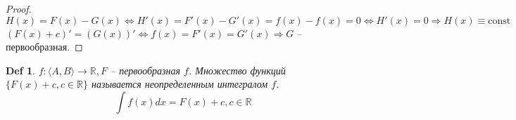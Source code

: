 \documentclass[12pt]{article}
\def\R{\mathbb{R}}       %
\def\SO{\Rightarrow}     %
\def\EQ{\Leftrightarrow} %
\theoremstyle{definition} %
\theoremstyle{plain} %
\newtheorem{Def}[Thm]{Def} %
\theoremstyle{remark} %
\begin{document}
\begin{proof}
    $H(x) = F(x) - G(x) \EQ H'(x) = F'(x) - G'(x) = f(x) - f(x) = 0 \EQ H'(x) = 0 \SO H(x) \equiv \text{const}$ \\
    $(F(x) + c)' = (G(x))' \EQ f(x) = F'(x) = G'(x) \SO G$ -- первообразная.  
\end{proof}

\begin{Def}
    $f : \langle A, B\rangle \to \R, F$ -- первообразная $f$. Множество функций 
    $\{F(x) + c, c \in \R\}$ называется неопределенным интегралом $f$.
    \[\int f(x) dx = F(x) + c, c \in \R \] 
\end{Def}
\end{document}

